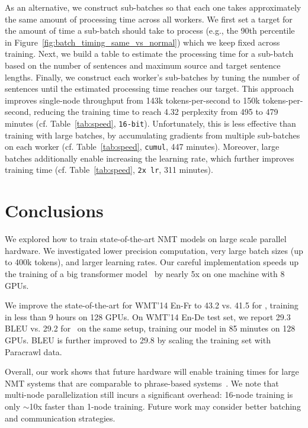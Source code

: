 \documentclass[11pt,a4paper]{article}
\begin{document}
As an alternative, we construct sub-batches so that each one takes approximately the same amount of processing time across all workers.
We first set a target for the amount of time a sub-batch should take to process (e.g., the 90th percentile in Figure~\ref{fig:batch_timing_same_vs_normal}) which we keep fixed across training.
Next, we build a table to estimate the processing time for a sub-batch based on the number of sentences and maximum source and target sentence lengths.
Finally, we construct each worker's sub-batches by tuning the number of sentences until the estimated processing time reaches our target.
This approach improves single-node throughput from 143k tokens-per-second to 150k tokens-per-second, reducing the training time to reach 4.32 perplexity from 495 to 479 minutes (cf. Table~\ref{tab:speed}, \texttt{16-bit}).
Unfortunately, this is less effective than training with large batches, by accumulating gradients from multiple sub-batches on each worker (cf. Table~\ref{tab:speed}, \texttt{cumul}, 447 minutes).
Moreover, large batches additionally enable increasing the learning rate, which further improves training time (cf. Table~\ref{tab:speed}, \texttt{2x lr}, 311 minutes).

\section{Conclusions}

We explored how to train state-of-the-art NMT models on large scale parallel hardware. We investigated lower precision computation, very large batch sizes (up to 400k tokens), and larger learning rates. Our careful implementation speeds up the training of a big transformer model~\citep{vaswani2017transformer} by nearly 5x on one machine with 8 GPUs. 

We improve the state-of-the-art for WMT'14 En-Fr to 43.2 vs. 41.5 for \citet{shaw2018relpos}, training in less than 9 hours on 128 GPUs. On WMT'14 En-De test set, we report 29.3 BLEU vs. 29.2 for~\citet{shaw2018relpos} on the same setup, training our model in 85 minutes on 128 GPUs.
BLEU is further improved to 29.8 by scaling the training set with Paracrawl data.

Overall, our work shows that future hardware will enable training times for large NMT systems that are comparable to phrase-based systems~\cite{koehn:moses:2007}. We note that multi-node parallelization still incurs a significant overhead: 16-node training is only $\sim$10x faster than 1-node training. Future work may consider better batching and communication strategies.




\end{document}
